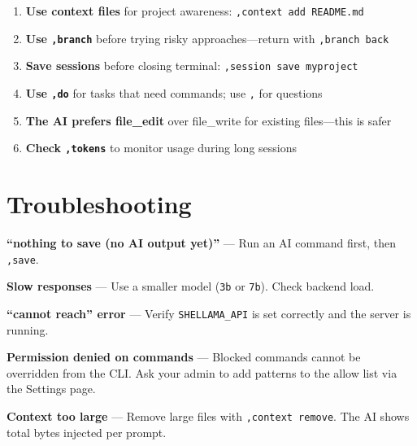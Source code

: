 \documentclass[11pt,a4paper]{article}
\begin{document}
\begin{enumerate}
  \item \textbf{Use context files} for project awareness: \texttt{,context add README.md}
  \item \textbf{Use \texttt{,branch}} before trying risky approaches---return with \texttt{,branch back}
  \item \textbf{Save sessions} before closing terminal: \texttt{,session save myproject}
  \item \textbf{Use \texttt{,do}} for tasks that need commands; use \texttt{,} for questions
  \item \textbf{The AI prefers file\_edit} over file\_write for existing files---this is safer
  \item \textbf{Check \texttt{,tokens}} to monitor usage during long sessions
\end{enumerate}

\section{Troubleshooting}

\textbf{``nothing to save (no AI output yet)''} --- Run an AI command first, then \texttt{,save}.

\textbf{Slow responses} --- Use a smaller model (\texttt{3b} or \texttt{7b}). Check backend load.

\textbf{``cannot reach'' error} --- Verify \texttt{SHELLAMA\_API} is set correctly and the server is running.

\textbf{Permission denied on commands} --- Blocked commands cannot be overridden from the CLI. Ask your admin to add patterns to the allow list via the Settings page.

\textbf{Context too large} --- Remove large files with \texttt{,context remove}. The AI shows total bytes injected per prompt.
\end{document}
